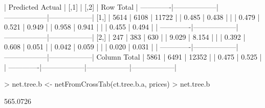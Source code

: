 \documentclass{article}
\begin{document}
\begin{Schunk}
\begin{Soutput}
 
             | Predicted 
      Actual |             [,1] |             [,2] |        Row Total | 
-------------|------------------|------------------|------------------|
        [1,] |             5614 |             6108 |            11722 | 
             |            0.485 |            0.438 |                  | 
             |            0.479 |            0.521 |            0.949 | 
             |            0.958 |            0.941 |                  | 
             |            0.455 |            0.494 |                  | 
-------------|------------------|------------------|------------------|
        [2,] |              247 |              383 |              630 | 
             |            9.029 |            8.154 |                  | 
             |            0.392 |            0.608 |            0.051 | 
             |            0.042 |            0.059 |                  | 
             |            0.020 |            0.031 |                  | 
-------------|------------------|------------------|------------------|
Column Total |             5861 |             6491 |            12352 | 
             |            0.475 |            0.525 |                  | 
-------------|------------------|------------------|------------------|
\end{Soutput}
\begin{Sinput}
> net.tree.b <- netFromCrossTab(ct.tree.b.a, prices)
> net.tree.b
\end{Sinput}
\begin{Soutput}
[1] 565.0726
\end{Soutput}
\end{Schunk}
\end{document}
